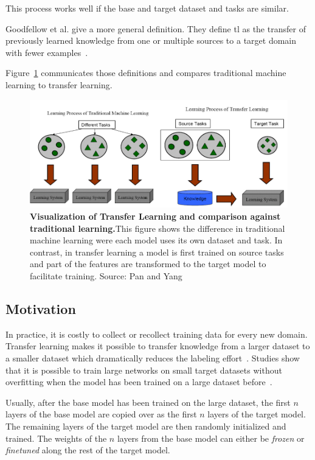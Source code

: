 This process works well if the base and target dataset and tasks are similar.
\medskip

Goodfellow et al. give a more general definition. They define \gls{tl} as the transfer of previously learned knowledge from one or multiple sources to a target domain with fewer examples~\cite{Goodfellow2016}.

Figure~\ref{fig:03_transferLearning} communicates those definitions and compares traditional machine learning to transfer learning.
\begin{figure}[ht]
    \centering
    \includegraphics[scale=0.55]{figures/03_theory/03_transferLearning}
    \caption{\textbf{Visualization of Transfer Learning and comparison against traditional learning.}This figure shows the difference in traditional machine learning were each model uses its own dataset and task. In contrast, in transfer learning a model is first trained on source tasks and part of the features are transformed to the target model to facilitate training. Source: Pan and Yang~\cite{Pan2010}}
    \label{fig:03_transferLearning}
\end{figure}

\subsection*{Motivation}

In practice, it is costly to collect or recollect training data for every new domain. Transfer learning makes it possible to transfer knowledge from a larger dataset to a smaller dataset which dramatically reduces the labeling effort~\cite{Blitzer2007}. Studies show that it is possible to train large networks on small target datasets without overfitting when the model has been trained on a large dataset before~\cite{Donahue2013, Zeiler2014}. 

Usually, after the base model has been trained on the large dataset, the first $n$ layers of the base model are copied over as the first $n$ layers of the target model. The remaining layers of the target model are then randomly initialized and trained. The weights of the $n$ layers from the base model can either be \textit{frozen} or \textit{finetuned} along the rest of the target model. 

